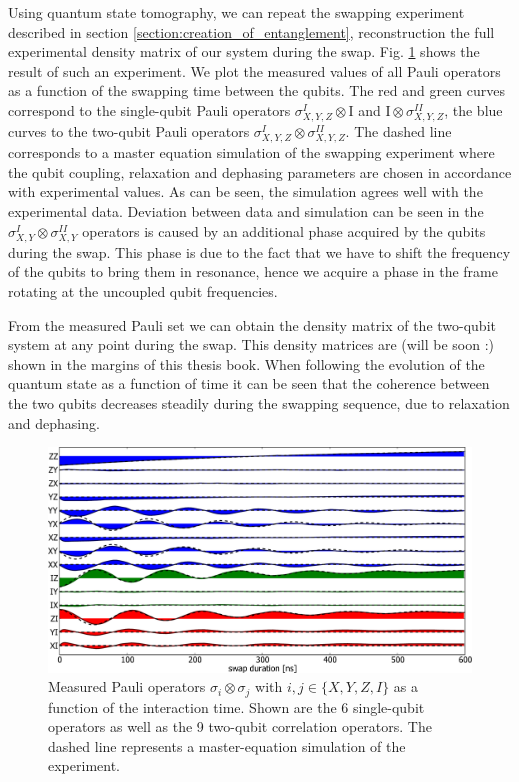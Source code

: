 Using quantum state tomography, we can repeat the swapping experiment described in section \ref{section:creation_of_entanglement}, reconstruction the full experimental density matrix of our system during the swap. Fig. \ref{fig:swap_pauli_set_vs_time_with_simulation} shows the result of such an experiment. We plot the measured values of all Pauli operators as a function of the swapping time between the qubits. The red and green curves correspond to the single-qubit Pauli operators $\sigma^I_{X,Y,Z}\otimes \mathrm{I}$ and $\mathrm{I}\otimes \sigma^{II}_{X,Y,Z}$, the blue curves to the two-qubit Pauli operators $\sigma_{X,Y,Z}^I\otimes \sigma_{X,Y,Z}^{II}$. The dashed line corresponds to a master equation simulation of the swapping experiment where the qubit coupling, relaxation and dephasing parameters are chosen in accordance with experimental values. As can be seen, the simulation agrees well with the experimental data. Deviation between data and simulation can be seen in the $\sigma_{X,Y}^I\otimes \sigma_{X,Y}^{II}$ operators is caused by an additional phase acquired by the qubits during the swap. This phase is due to the fact that we have to shift the frequency of the qubits to bring them in resonance, hence we acquire a phase in the frame rotating at the uncoupled qubit frequencies.

\smallskip

From the measured Pauli set we can obtain the density matrix of the two-qubit system at any point during the swap. This density matrices are (will be soon :) shown in the margins of this thesis book. When following the evolution of the quantum state as a function of time it can be seen that the coherence between the two qubits decreases steadily during the swapping sequence, due to relaxation and dephasing.

\begin{figure}[ht!]
   \centering
	 \includegraphics[width=1.\textwidth]{"./data/ct5/film of swap/pauli_set_vs_time_with_simulation"}
	 \caption[test]{Measured Pauli operators $\sigma_i \otimes \sigma_j$ with $i,j \in \{X,Y,Z,I\}$ as a function of the interaction time. Shown are the 6 single-qubit operators as well as the 9 two-qubit correlation operators. The dashed line represents a master-equation simulation of the experiment.}
	 \label{fig:swap_pauli_set_vs_time_with_simulation}
\end{figure}

